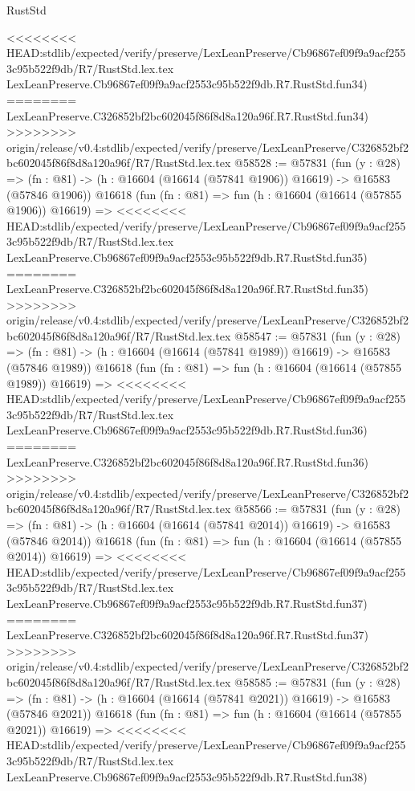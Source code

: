 \begin{lexlean}{RustStd}
\begin{coremodule}
{\begin{coremodule}
{{{{{{{{{{{{{{{{{{{{{{{{{{{{{{{{{{{{{{{{{{{{{{{{{{{{{{{<<<<<<<< HEAD:stdlib/expected/verify/preserve/LexLeanPreserve/Cb96867ef09f9a9acf2553c95b522f9db/R7/RustStd.lex.tex
    LexLeanPreserve.Cb96867ef09f9a9acf2553c95b522f9db.R7.RustStd.fun34)
========
    LexLeanPreserve.C326852bf2bc602045f86f8d8a120a96f.R7.RustStd.fun34)
>>>>>>>> origin/release/v0.4:stdlib/expected/verify/preserve/LexLeanPreserve/C326852bf2bc602045f86f8d8a120a96f/R7/RustStd.lex.tex
@58528 := @57831
    (fun (y : @28) =>
    (fn : @81) -> (h : @16604 (@16614 (@57841 @1906)) @16619) -> @16583 (@57846 @1906))
    @16618
    (fun (fn : @81) =>
    fun (h : @16604 (@16614 (@57855 @1906)) @16619) =>
<<<<<<<< HEAD:stdlib/expected/verify/preserve/LexLeanPreserve/Cb96867ef09f9a9acf2553c95b522f9db/R7/RustStd.lex.tex
    LexLeanPreserve.Cb96867ef09f9a9acf2553c95b522f9db.R7.RustStd.fun35)
========
    LexLeanPreserve.C326852bf2bc602045f86f8d8a120a96f.R7.RustStd.fun35)
>>>>>>>> origin/release/v0.4:stdlib/expected/verify/preserve/LexLeanPreserve/C326852bf2bc602045f86f8d8a120a96f/R7/RustStd.lex.tex
@58547 := @57831
    (fun (y : @28) =>
    (fn : @81) -> (h : @16604 (@16614 (@57841 @1989)) @16619) -> @16583 (@57846 @1989))
    @16618
    (fun (fn : @81) =>
    fun (h : @16604 (@16614 (@57855 @1989)) @16619) =>
<<<<<<<< HEAD:stdlib/expected/verify/preserve/LexLeanPreserve/Cb96867ef09f9a9acf2553c95b522f9db/R7/RustStd.lex.tex
    LexLeanPreserve.Cb96867ef09f9a9acf2553c95b522f9db.R7.RustStd.fun36)
========
    LexLeanPreserve.C326852bf2bc602045f86f8d8a120a96f.R7.RustStd.fun36)
>>>>>>>> origin/release/v0.4:stdlib/expected/verify/preserve/LexLeanPreserve/C326852bf2bc602045f86f8d8a120a96f/R7/RustStd.lex.tex
@58566 := @57831
    (fun (y : @28) =>
    (fn : @81) -> (h : @16604 (@16614 (@57841 @2014)) @16619) -> @16583 (@57846 @2014))
    @16618
    (fun (fn : @81) =>
    fun (h : @16604 (@16614 (@57855 @2014)) @16619) =>
<<<<<<<< HEAD:stdlib/expected/verify/preserve/LexLeanPreserve/Cb96867ef09f9a9acf2553c95b522f9db/R7/RustStd.lex.tex
    LexLeanPreserve.Cb96867ef09f9a9acf2553c95b522f9db.R7.RustStd.fun37)
========
    LexLeanPreserve.C326852bf2bc602045f86f8d8a120a96f.R7.RustStd.fun37)
>>>>>>>> origin/release/v0.4:stdlib/expected/verify/preserve/LexLeanPreserve/C326852bf2bc602045f86f8d8a120a96f/R7/RustStd.lex.tex
@58585 := @57831
    (fun (y : @28) =>
    (fn : @81) -> (h : @16604 (@16614 (@57841 @2021)) @16619) -> @16583 (@57846 @2021))
    @16618
    (fun (fn : @81) =>
    fun (h : @16604 (@16614 (@57855 @2021)) @16619) =>
<<<<<<<< HEAD:stdlib/expected/verify/preserve/LexLeanPreserve/Cb96867ef09f9a9acf2553c95b522f9db/R7/RustStd.lex.tex
    LexLeanPreserve.Cb96867ef09f9a9acf2553c95b522f9db.R7.RustStd.fun38)
}}}}}}}}}}}}}}}}}}}}}}}}}}}}}}}}}}}}}}}}}}}}}}}}}}}}}}}
\end{coremodule}}
\end{coremodule}
\end{lexlean}
